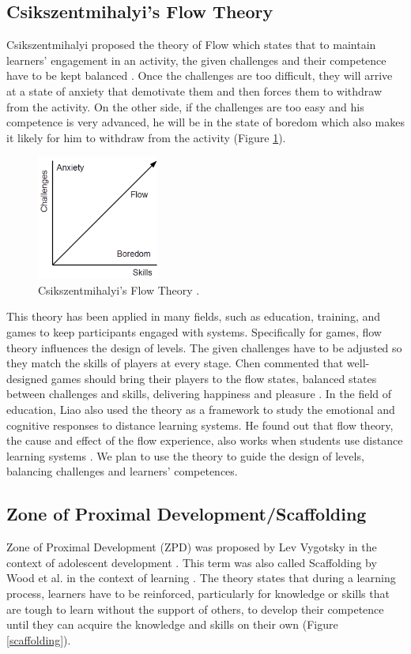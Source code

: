 \documentclass[12pt, a4paper]{report}
\begin{document}
\subsection{Csikszentmihalyi's Flow Theory}
Csikszentmihalyi proposed the theory of Flow which states that to maintain learners' engagement in an activity, the given challenges and their competence have to be kept balanced \cite{csikszentmihalyi2014toward}. Once the challenges are too difficult, they will arrive at a state of anxiety that demotivate them and then forces them to withdraw from the activity. On the other side, if the challenges are too easy and his competence is very advanced, he will be in the state of boredom which also makes it likely for him to withdraw from the activity (Figure \ref{flow-theory}).

\begin{figure}[ht]
\centering
\includegraphics[width=4cm]{flow-theory}
\caption{Csikszentmihalyi's Flow Theory \cite{csikszentmihalyi2014toward}.}
\label{flow-theory}
\end{figure}
 
This theory has been applied in many fields, such as education, training, and games to keep participants engaged with systems. Specifically for games, flow theory influences the design of levels. The given challenges have to be adjusted so they match the skills of players at every stage. Chen commented that well-designed games should bring their players to the flow states, balanced states between challenges and skills, delivering happiness and pleasure \cite{chen2007flow}. In the field of education, Liao also used the theory as a framework to study the emotional and cognitive responses to distance learning systems. He found out that flow theory, the cause and effect of the flow experience, also works when students use distance learning systems \cite{liao2006flow}. We plan to use the theory to guide the design of levels, balancing challenges and learners' competences. 

\subsection{Zone of Proximal Development/Scaffolding}
Zone of Proximal Development (ZPD) was proposed by Lev Vygotsky in the context of adolescent development \cite{vygotsky1978mind}. This term was also called Scaffolding by Wood et al. in the context of learning \cite{wood1976role}. The theory states that during a learning process, learners have to be reinforced, particularly for knowledge or skills that are tough to learn without the support of others, to develop their competence until they can acquire the knowledge and skills on their own (Figure \ref{scaffolding}). 
\end{document}
